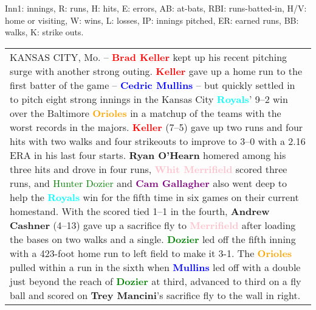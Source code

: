 \documentclass[11pt,a4paper]{article}
\newcommand{\lform}[1]{\textsf{\scriptsize{#1}}}
\begin{document}
\begin{figure*}
\begin{small}
\begin{minipage}{0.4\textwidth}
\vspace{.3cm}                        

\lform{Inn1:} innings, \lform{R:} runs, \lform{H:}  hits, \lform{E:}  errors,
 \lform{AB:} at-bats, \lform{RBI:} runs-batted-in, \lform{H/V:} home or visiting,
  \lform{W:} wins, \lform{L:} losses,  \lform{IP:} innings pitched, \lform{ER:} earned runs,
  \lform{BB:} walks, \lform{K:} strike outs.

\end{minipage}
\begin{minipage}{0.5\textwidth}
\vspace*{-.4cm}

\hspace*{-1.3cm}\begin{tabular}{p{9cm}} \hline 
  
                  {\footnotesize
                  KANSAS CITY, Mo. -- \textcolor{red}{\textbf{Brad Keller}} kept up his recent pitching surge with another strong outing.
                  \textcolor{red}{\textbf{Keller}} gave up a home run to the first batter of the game -- \textcolor{blue}{\textbf{Cedric Mullins}} -- but quickly settled in to pitch eight strong innings in the Kansas City \textcolor{cyan}{\textbf{Royals}}' 9--2 win over the Baltimore \textcolor{orange}{\textbf{Orioles}} in a matchup of the teams with the worst records in the majors.
                  \textcolor{red}{\textbf{Keller}} (7--5) gave up two runs and four hits with two walks and four strikeouts to improve to 3--0 with a 2.16 ERA in his last four starts.
                  \textbf{Ryan O'Hearn} homered among his three hits and drove in four runs, \textcolor{pink}{\textbf{Whit Merrifield}} scored three runs, and \textcolor{green}{Hunter Dozier} and \textcolor{purple}{\textbf{Cam Gallagher}} also went deep to help the \textcolor{cyan}{\textbf{Royals}} win for the fifth time in six games on their current homestand.
                  With the scored tied 1--1 in the fourth, \textbf{Andrew Cashner} (4--13) gave up a sacrifice fly to \textcolor{pink}{\textbf{Merrifield}} after loading the bases on two walks and a single. \textcolor{green}{\textbf{Dozier}} led off the fifth inning with a 423-foot home run to left field to make it 3-1.
                  The \textcolor{orange}{\textbf{Orioles}} pulled within a run in the sixth when
                  \textcolor{blue}{\textbf{Mullins}} led off with a double just beyond the reach of \textcolor{green}{\textbf{Dozier}} at third, advanced to third on a fly ball and scored on \textbf{Trey Mancini}'s sacrifice fly to the wall in right.
}
\end{tabular}
\end{minipage}
\end{small}
\end{figure*}
\end{document}
